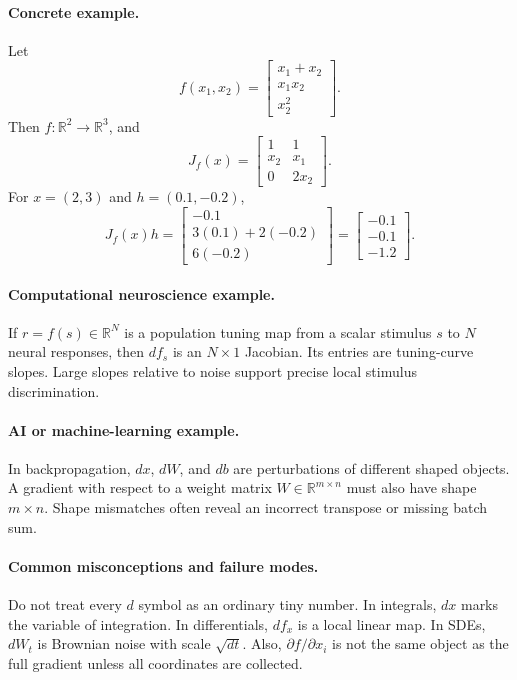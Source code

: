 \paragraph{Concrete example.}
Let
\[
f(x_1,x_2)=
\begin{bmatrix}
x_1+x_2\\
x_1x_2\\
x_2^2
\end{bmatrix}.
\]
Then \(f:\mathbb R^2\to\mathbb R^3\), and
\[
J_f(x)=
\begin{bmatrix}
1&1\\
x_2&x_1\\
0&2x_2
\end{bmatrix}.
\]
For \(x=(2,3)\) and \(h=(0.1,-0.2)\),
\[
J_f(x)h=
\begin{bmatrix}
-0.1\\
3(0.1)+2(-0.2)\\
6(-0.2)
\end{bmatrix}
=
\begin{bmatrix}
-0.1\\
-0.1\\
-1.2
\end{bmatrix}.
\]

\paragraph{Computational neuroscience example.}
If \(r=f(s)\in\mathbb R^N\) is a population tuning map from a scalar stimulus \(s\) to \(N\) neural responses, then \(df_s\) is an \(N\times1\) Jacobian. Its entries are tuning-curve slopes. Large slopes relative to noise support precise local stimulus discrimination.

\paragraph{AI or machine-learning example.}
In backpropagation, \(dx\), \(dW\), and \(db\) are perturbations of different shaped objects. A gradient with respect to a weight matrix \(W\in\mathbb R^{m\times n}\) must also have shape \(m\times n\). Shape mismatches often reveal an incorrect transpose or missing batch sum.

\paragraph{Common misconceptions and failure modes.}
Do not treat every \(d\) symbol as an ordinary tiny number. In integrals, \(dx\) marks the variable of integration. In differentials, \(df_x\) is a local linear map. In SDEs, \(dW_t\) is Brownian noise with scale \(\sqrt{dt}\). Also, \(\partial f/\partial x_i\) is not the same object as the full gradient unless all coordinates are collected.

